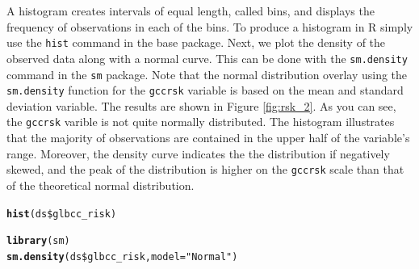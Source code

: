 \documentclass[11pt,openany]{book}\usepackage[]{graphicx}\usepackage[]{color}
\makeatletter
\newcommand{\hlstr}[1]{\textcolor[rgb]{0.192,0.494,0.8}{#1}}%
\newcommand{\hlopt}[1]{\textcolor[rgb]{0,0,0}{#1}}%
\newcommand{\hlstd}[1]{\textcolor[rgb]{0.345,0.345,0.345}{#1}}%
\newcommand{\hlkwc}[1]{\textcolor[rgb]{0.333,0.667,0.333}{#1}}%
\newcommand{\hlkwd}[1]{\textcolor[rgb]{0.737,0.353,0.396}{\textbf{#1}}}%
\newenvironment{kframe}{%
 \def\at@end@of@kframe{}%
 \ifinner\ifhmode%
  \def\at@end@of@kframe{\end{minipage}}%
  \begin{minipage}{\columnwidth}%
 \fi\fi%
 \def\FrameCommand##1{\hskip\@totalleftmargin \hskip-\fboxsep
 \colorbox{shadecolor}{##1}\hskip-\fboxsep
     \hskip-\linewidth \hskip-\@totalleftmargin \hskip\columnwidth}%
 \MakeFramed {\advance\hsize-\width
   \@totalleftmargin\z@ \linewidth\hsize
   \@setminipage}}%
 {\par\unskip\endMakeFramed%
 \at@end@of@kframe}
\newenvironment{knitrout}{}{} %
\renewenvironment{knitrout}{\begin{singlespace}}{\end{singlespace}}
\makeatother
\begin{document}
A histogram creates intervals of equal length, called bins, and displays the frequency of observations in each of the bins. To produce a histogram in R simply use the \texttt{hist} command in the base package. Next, we  plot the density of the observed data along with a normal curve.  This can be done with the \texttt{sm.density} command in the \texttt{sm} package. Note that the normal distribution overlay using the \texttt{sm.density} function for the \texttt{gccrsk} variable is based on the mean and standard deviation variable. The results are shown in Figure \ref{fig:rsk_2}. As you can see, the \texttt{gccrsk} varible is not quite normally distributed.  The histogram illustrates that the majority of observations are contained in the upper half of the variable's range.  Moreover, the density curve indicates the the distribution if negatively skewed, and the peak of the distribution is higher on the \texttt{gccrsk} scale than that of the theoretical normal distribution.

\begin{knitrout}
\color{fgcolor}\begin{kframe}
\begin{alltt}
\hlkwd{hist}\hlstd{(ds}\hlopt{\$}\hlstd{glbcc_risk)}
\end{alltt}
\end{kframe}
\end{knitrout}

\begin{knitrout}
\color{fgcolor}\begin{kframe}
\begin{alltt}
\hlkwd{library}\hlstd{(sm)}
\hlkwd{sm.density}\hlstd{(ds}\hlopt{\$}\hlstd{glbcc_risk,} \hlkwc{model} \hlstd{=} \hlstr{"Normal"}\hlstd{)}
\end{alltt}
\end{kframe}
\end{knitrout}
\end{document}
